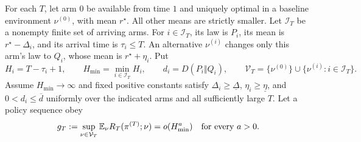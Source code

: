 For each $T$, let arm $0$ be available from time $1$ and uniquely optimal
in a baseline environment $\nu^{(0)}$, with mean $r^\star$. All other
means are strictly smaller. Let $\mathcal I_T$ be a nonempty finite set
of arriving arms. For $i\in\mathcal I_T$, its law is $P_i$, its mean is
$r^\star-\Delta_i$, and its arrival time is $\tau_i\le T$. An alternative
$\nu^{(i)}$ changes only this arm's law to $Q_i$, whose mean is
$r^\star+\eta_i$. Put
\[
 H_i=T-\tau_i+1,\qquad H_{\min}=\min_{i\in\mathcal I_T}H_i,\qquad
 d_i=D(P_i\Vert Q_i),\qquad
 \mathcal V_T=\{\nu^{(0)}\}\cup\{\nu^{(i)}:i\in\mathcal I_T\}.
\]
Assume $H_{\min}\to\infty$ and fixed positive constants satisfy
$\Delta_i\ge\underline\Delta$, $\eta_i\ge\underline\eta$, and
$0<d_i\le\overline d$ uniformly over the indicated arms and all
sufficiently large $T$. Let a policy sequence obey
\[
 g_T:=\sup_{\nu\in\mathcal V_T}
       \mathbb E_\nu R_T(\pi^{(T)};\nu)
       =o(H_{\min}^a)\quad\text{for every }a>0.
\]

